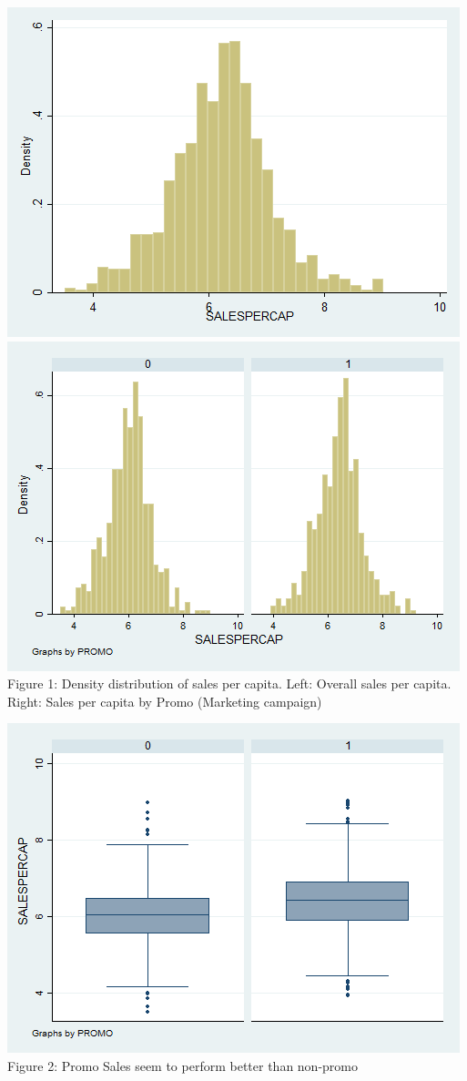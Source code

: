 \documentclass[10pt]{article}
\begin{document}
\begin{center}
 \includegraphics[scale=0.4]{g2.png}
  \includegraphics[scale=0.4]{g4.png}\\
Figure 1: Density distribution of sales per capita. Left: Overall sales per capita. Right: Sales per capita by Promo (Marketing campaign)
\end{center}

\begin{center}
  \includegraphics[scale=0.5]{g6.png}\\
Figure 2: Promo Sales seem to perform better than non-promo
\end{center}
\end{document}
